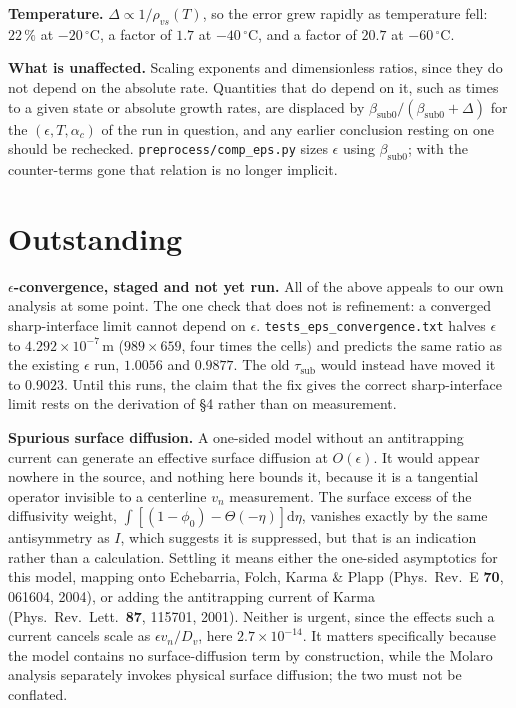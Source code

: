 \documentclass[11pt,a4paper]{article}
\newcommand{\code}[1]{\texttt{\small #1}}
\newcommand{\vn}{v_n}
\newcommand{\bsub}{\beta_{\mathrm{sub0}}}
\newcommand{\tsub}{\tau_{\mathrm{sub}}}
\begin{document}
\textbf{Temperature.} $\Delta\propto1/\rho_{vs}(T)$, so the error grew rapidly as
temperature fell: $22\,\%$ at $-20\,^\circ$C, a factor of $1.7$ at $-40\,^\circ$C, and a
factor of $20.7$ at $-60\,^\circ$C.

\textbf{What is unaffected.} Scaling exponents and dimensionless ratios, since they do not
depend on the absolute rate. Quantities that do depend on it, such as times to a given
state or absolute growth rates, are displaced by $\bsub/(\bsub+\Delta)$ for the
$(\epsilon,T,\alpha_c)$ of the run in question, and any earlier conclusion resting on one
should be rechecked. \code{preprocess/comp\_eps.py} sizes $\epsilon$ using $\bsub$; with
the counter-terms gone that relation is no longer implicit.

\section{Outstanding}\label{sec:open}

\textbf{$\epsilon$-convergence, staged and not yet run.} All of the above appeals to our
own analysis at some point. The one check that does not is refinement: a converged
sharp-interface limit cannot depend on $\epsilon$. \code{tests\_eps\_convergence.txt}
halves $\epsilon$ to $4.292\times10^{-7}$\,m ($989\times659$, four times the cells) and
predicts the same ratio as the existing $\epsilon$ run, $1.0056$ and $0.9877$. The old
$\tsub$ would instead have moved it to $0.9023$. Until this runs, the claim that the fix
gives the correct sharp-interface limit rests on the derivation of \S4 rather than on
measurement.

\textbf{Spurious surface diffusion.} A one-sided model without an antitrapping current
can generate an effective surface diffusion at $O(\epsilon)$. It would appear nowhere in
the source, and nothing here bounds it, because it is a tangential operator invisible to a
centerline $\vn$ measurement. The surface excess of the diffusivity weight,
$\int[(1-\phi_0)-\Theta(-\eta)]\mathrm{d}\eta$, vanishes exactly by the same antisymmetry
as $I$, which suggests it is suppressed, but that is an indication rather than a
calculation. Settling it means either the one-sided asymptotics for this model, mapping
onto Echebarria, Folch, Karma \& Plapp (Phys.\ Rev.\ E \textbf{70}, 061604, 2004), or
adding the antitrapping current of Karma (Phys.\ Rev.\ Lett.\ \textbf{87}, 115701, 2001).
Neither is urgent, since the effects such a current cancels scale as $\epsilon \vn/D_v$,
here $2.7\times10^{-14}$. It matters specifically because the model contains no
surface-diffusion term by construction, while the Molaro analysis separately invokes
physical surface diffusion; the two must not be conflated.
\end{document}
